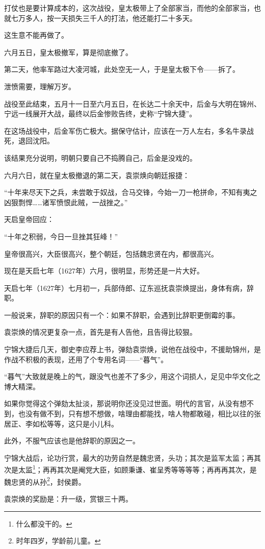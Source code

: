 \begin{multicols}{\theparacolNo}
打仗也是要计算成本的，这次战役，皇太极带上了全部家当，而他的全部家当，也就七万多人，按一天损失三千人的打法，他还能打二十多天。

这生意不能再做了。

六月五日，皇太极撤军，算是彻底撤了。

第二天，他率军路过大凌河城，此处空无一人，于是皇太极下令——拆了。

泄愤需要，理解万岁。

战役至此结束，五月十一日至六月五日，在长达二十余天中，后金与大明在锦州、宁远一线展开大战，最终以后金惨败告终，史称“宁锦大捷”。

在这场战役中，后金军伤亡极大。据保守估计，应该在一万人左右，多名牛录战死，退回沈阳。

该结果充分说明，明朝只要自己不捣腾自己，后金是没戏的。

六月六日，就在皇太极撤退的第二天，袁崇焕向朝廷报捷：

“十年来尽天下之兵，未尝敢于奴战，合马交锋，今始一刀一枪拼命，不知有夷之凶狠剽悍……诸军愤恨此贼，一战挫之。”

天启皇帝回应：

“十年之积弱，今日一旦挫其狂峰！”

皇帝很高兴，大臣很高兴，整个朝廷，包括魏忠贤在内，都很高兴。

现在是天启七年（1627年）六月，很明显，形势还是一片大好。

天启七年（1627年）七月初一，兵部侍郎、辽东巡抚袁崇焕提出，身体有病，辞职。

一般说来，辞职的原因只有一个：如果不辞职，会遇到比辞职更倒霉的事。

袁崇焕的情况更复杂一点，首先是有人告他，且告得比较狠。

宁锦大捷后几天，御史李应荐上书，弹劾袁崇焕，说他在战役中，不援助锦州，是作战不积极的表现，还用了个专用名词——“暮气”。

“暮气”大致就是晚上的气，跟没气也差不了多少，用这个词损人，足见中华文化之博大精深。

如果你觉得这个弹劾太扯淡，那说明你还没见过世面。明代的言官，从没有想不到，也没有做不到，只有想不想做，啥理由都能找，啥人物都敢碰，相比以往的张居正、李如松等等，这只是小儿科。

此外，不服气应该也是他辞职的原因之一。

宁锦大战后，论功行赏，最大的功劳自然是魏忠贤，头功；其次是监军太监；再其次是太监\footnote{什么都没干的。}；再再其次是阉党大臣，如顾秉谦、崔呈秀等等等等；再再再其次，是魏忠贤的从孙\footnote{时年四岁，学龄前儿童。}，封侯爵。

袁崇焕的奖励是：升一级，赏银三十两。


\end{multicols}
